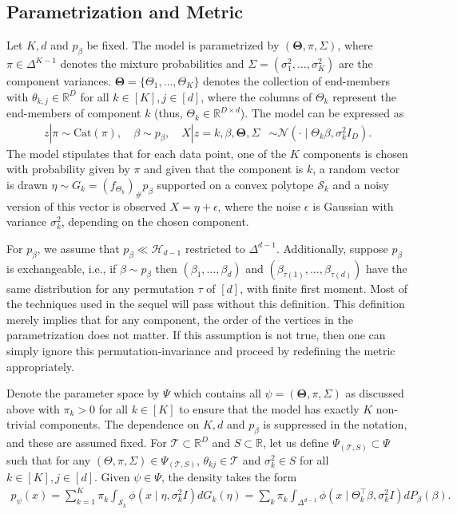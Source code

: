\documentclass[bj,authoryear]{imsart}
\theoremstyle{plain}
\theoremstyle{remark}
\def\bTheta{{\boldsymbol\Theta}}
\def\bbR{\mathbb{R}}
\def\cH{\mathcal{H}}
\def\cN{\mathcal{N}}
\def\cS{\mathcal{S}}
\def\cT{\mathcal{T}}
\def\bTheta{\boldsymbol{\Theta}}
\begin{document}
\subsection{Parametrization and Metric}
Let $K, d$ and $p_\beta$ be fixed. The model is parametrized by
$(\bTheta,\pi, \Sigma)$, where $\pi\in\Delta^{K-1}$ denotes the mixture probabilities and $\Sigma=(\sigma_1^2,\dots,\sigma_K^2)$ are the component variances. $\bTheta = \{\Theta_1,\dots,\Theta_K\}$ denotes the collection of end-members with $\theta_{k,j} \in \bbR^D$ for all $k\in [K], j\in [d]$, where the columns of $\Theta_k$ represent the end-members of component $k$ (thus, $\Theta_k\in\bbR^{D\times d}$). The model can be expressed as
\begin{equation}
\begin{aligned}\label{model:parametrization}
    z | \pi \sim \text{Cat}(\pi), \quad
    \beta \sim p_{\beta}, \quad 
    X|z=k, \beta, \bTheta, \Sigma &\sim \cN\left(\cdot \mid\Theta_k \beta, \sigma_k^2 I_D\right).
    \end{aligned}
\end{equation}
The model stipulates that for each data point, one of the $K$ components is chosen with probability given by $\pi$ and given that the component is $k$, a random vector is drawn $\eta\sim G_k=(f_{\Theta_k})_{\#} p_{\beta}$ supported on a convex polytope $\cS_k$ and a noisy version of this vector is observed $X=\eta+\epsilon$, where the noise $\epsilon$ is Gaussian with variance $\sigma_k^2$, depending on the chosen component.

For $p_\beta$, we assume that $p_\beta \ll \cH_{d-1}$ restricted to $\Delta^{d-1}$. Additionally, suppose $p_{\beta}$ is exchangeable, i.e., if $\beta\sim p_{\beta}$ then $(\beta_1,\dots,\beta_d)$ and $(\beta_{\tau(1)},\dots,\beta_{\tau(d)})$ have the same distribution for any permutation $\tau$ of $[d]$, with finite first moment. Most of the techniques used in the sequel will pass without this definition. This definition merely implies that for any component, the order of the vertices in the parametrization does not matter. If this assumption is not true, then one can simply ignore this permutation-invariance and proceed by redefining the metric appropriately. 

Denote the parameter space by $\Psi$ which contains all $\psi = (\bTheta, \pi,\Sigma)$ as discussed above with $\pi_k>0$ for all $k\in[K]$ to ensure that the model has exactly $K$ non-trivial components. The dependence on $K, d$ and $p_\beta$ is suppressed in the notation, and these are assumed fixed. For $\cT\subset \bbR^D$ and $S\subset \bbR$, let us define $\Psi_{(\cT,S)}\subset\Psi$ such that for any $(\Theta,\pi,\Sigma)\in \Psi_{(\cT,S)}$, $\theta_{kj}\in\cT$ and $\sigma_k^2 \in S$ for all $k\in[K], j\in[d]$.
Given $\psi\in \Psi$, the density takes the form
\begin{align}\label{eq:density_1}
    p_{\psi}(x) = \sum_{k=1}^K \pi_k \int_{\cS_k} \phi(x\mid \eta, \sigma_k^2 I) dG_k(\eta)=\sum_k \pi_k \int_{\Delta^{d-1}} \phi(x\mid \Theta_k^\top\beta, \sigma_k^2 I) dP_{\beta}(\beta).
\end{align}
\end{document}
